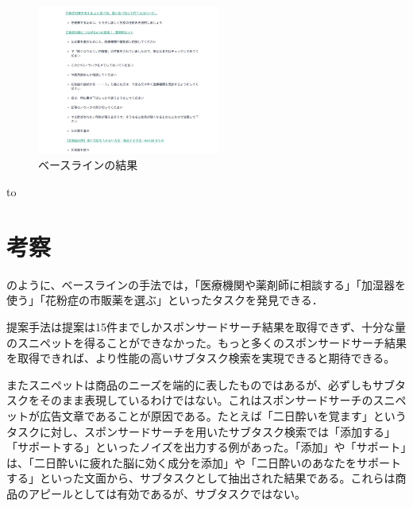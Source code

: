 \documentclass[submit,techreq]{ipsj}
\begin{document}
\begin{figure}[tb]
\includegraphics[width=6cm, bb=0 0 550 719]{base_line3.jpg}
\caption{ベースラインの結果}
\label{fig:baseline_result}
\end{figure}




\begin{table}[tb] 
\caption{花粉症対策の方法タスク検索} 
\label{tab:result}
\hbox to
\end{table}



\section{考察}


のように、ベースラインの手法では，「医療機関や薬剤師に相談する」「加湿器を使う」「花粉症の市販薬を選ぶ」といったタスクを発見できる．


提案手法は提案は15件までしかスポンサードサーチ結果を取得できず、十分な量のスニペットを得ることができなかった。もっと多くのスポンサードサーチ結果を取得できれば、より性能の高いサブタスク検索を実現できると期待できる。

またスニペットは商品のニーズを端的に表したものではあるが、必ずしもサブタスクをそのまま表現しているわけではない。これはスポンサードサーチのスニペットが広告文章であることが原因である。たとえば「二日酔いを覚ます」というタスクに対し、スポンサードサーチを用いたサブタスク検索では「添加する」「サポートする」といったノイズを出力する例があった。「添加」や「サポート」は、「二日酔いに疲れた脳に効く成分を添加」や「二日酔いのあなたをサポートする」といった文面から、サブタスクとして抽出された結果である。これらは商品のアピールとしては有効であるが、サブタスクではない。
\end{document}
